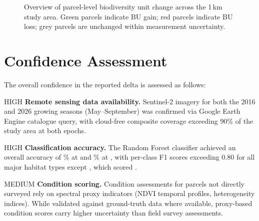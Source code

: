 \begin{figure}[H]
\centering
\caption{Overview of parcel-level biodiversity unit change across the 1\,km study area. Green parcels indicate BU gain; red parcels indicate BU loss; grey parcels are unchanged within measurement uncertainty.}
\label{fig:exec-delta-map}
\end{figure}

\section{Confidence Assessment}

The overall confidence in the reported delta is assessed as follows:

\begin{confidencebox}{HIGH}
\textbf{Remote sensing data availability.} Sentinel-2 imagery for both the 2016 and 2026 growing seasons (May--September) was confirmed via Google Earth Engine catalogue query, with cloud-free composite coverage exceeding 90\% of the study area at both epochs.
\end{confidencebox}

\begin{confidencebox}{HIGH}
\textbf{Classification accuracy.} The Random Forest classifier achieved an overall accuracy of \% at \Tzero{} and \% at \Tone{}, with per-class F1 scores exceeding 0.80 for all major habitat types except , which scored .
\end{confidencebox}

\begin{confidencebox}{MEDIUM}
\textbf{Condition scoring.} Condition assessments for parcels not directly surveyed rely on spectral proxy indicators (NDVI temporal profiles, heterogeneity indices). While validated against ground-truth data where available, proxy-based condition scores carry higher uncertainty than field survey assessments.
\end{confidencebox}

